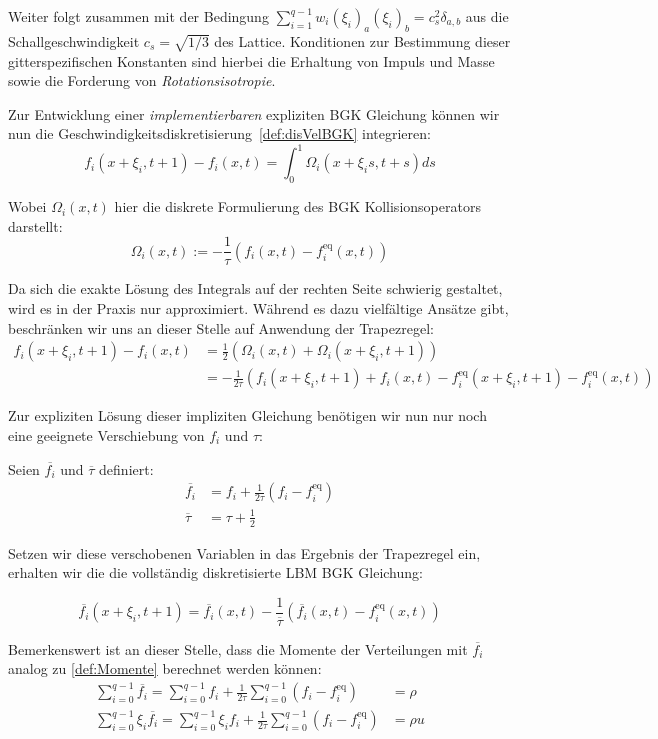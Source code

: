 Weiter folgt zusammen mit der Bedingung \(\sum_{i=1}^{q-1} w_i (\xi_i)_a (\xi_i)_b = c_s^2 \delta_{a,b}\) aus \cite[Gl.~3.60]{krueger17} die Schallgeschwindigkeit \(c_s = \sqrt{1/3}\) des Lattice. Konditionen zur Bestimmung dieser gitterspezifischen Konstanten sind hierbei die Erhaltung von Impuls und Masse sowie die Forderung von \emph{Rotationsisotropie}.

Zur Entwicklung einer \emph{implementierbaren} expliziten BGK Gleichung können wir nun die Geschwindigkeitsdiskretisierung~\ref{def:disVelBGK} integrieren:
\[ f_i(x+\xi_i, t+1) - f_i(x,t) = \int_0^1 \Omega_i(x+\xi_i s,t+s) ds \]

Wobei \(\Omega_i(x,t)\) hier die diskrete Formulierung des BGK Kollisionsoperators darstellt:
\[\Omega_i(x,t) := -\frac{1}{\tau} ( f_i(x,t) - f_i^\text{eq}(x, t) )\]

Da sich die exakte Lösung des Integrals auf der rechten Seite schwierig gestaltet, wird es in der Praxis nur approximiert. Während es dazu vielfältige Ansätze gibt, beschränken wir uns an dieser Stelle auf Anwendung der Trapezregel:
\begin{align*}
f_i(x+\xi_i,t+1) - f_i(x,t) &= \frac{1}{2} \left( \Omega_i(x,t) + \Omega_i(x+\xi_i,t+1) \right) \\
&= -\frac{1}{2\tau} \left( f_i(x+\xi_i,t+1) + f_i(x,t) - f_i^\text{eq}(x+\xi_i,t+1) - f_i^\text{eq}(x,t) \right)
\end{align*}

Zur expliziten Lösung dieser impliziten Gleichung benötigen wir nun nur noch eine geeignete Verschiebung von \(f_i\) und \(\tau\):

\begin{Definition}
\label{def:LBGKeq}
Seien \(\overline{f_i}\) und \(\overline\tau\) definiert:
\begin{align*}
\overline{f_i} &= f_i + \frac{1}{2\tau}(f_i - f_i^\text{eq}) \\
\overline\tau &= \tau + \frac{1}{2}
\end{align*}

Setzen wir diese verschobenen Variablen in das Ergebnis der Trapezregel ein, erhalten \cite[Kap.~A.5 mit \(\Delta t=1\)]{krueger17} wir die die vollständig diskretisierte LBM BGK Gleichung:

\[\overline{f_i}(x+\xi_i,t+1) = \overline{f_i}(x,t) - \frac{1}{\overline\tau} (\overline{f_i}(x,t) - f_i^\text{eq}(x,t))\]
\end{Definition}

Bemerkenswert ist an dieser Stelle, dass die Momente der Verteilungen mit \(\overline{f_i}\) analog zu \ref{def:Momente} berechnet werden können:
\begin{align*}
\sum_{i=0}^{q-1} \overline{f_i} = \sum_{i=0}^{q-1} f_i + \frac{1}{2\tau} \sum_{i=0}^{q-1} (f_i - f_i^\text{eq}) &= \rho \\
\sum_{i=0}^{q-1} \xi_i \overline{f_i} = \sum_{i=0}^{q-1} \xi_i f_i + \frac{1}{2\tau} \sum_{i=0}^{q-1} (f_i - f_i^\text{eq}) &= \rho u
\end{align*}

